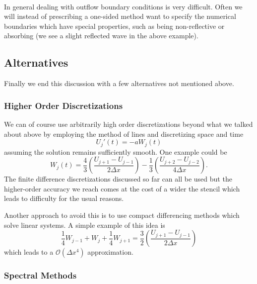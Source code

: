 \documentclass[11pt]{article}
\begin{document}
    \begin{center}
    \end{center}
    { \hspace*{\fill} \\}
    
    In general dealing with outflow boundary conditions is very difficult.
Often we will instead of prescribing a one-sided method want to specify
the numerical boundaries which have special properties, such as being
non-reflective or absorbing (we see a slight reflected wave in the above
example).

    \hypertarget{alternatives}{%
\subsection{Alternatives}\label{alternatives}}

Finally we end this discussion with a few alternatives not mentioned
above.

    \hypertarget{higher-order-discretizations}{%
\subsubsection{Higher Order
Discretizations}\label{higher-order-discretizations}}

We can of course use arbitrarily high order discretizations beyond what
we talked about above by employing the method of lines and discretizing
space and time \[
    U_j'(t) = -a W_j(t)
\] assuming the solution remains sufficiently smooth. One example could
be \[
    W_j(t) = \frac{4}{3} \left(\frac{U_{j+1} - U_{j-1}}{2 \Delta x} \right )- \frac{1}{3} \left(\frac{U_{j+2} - U_{j-2}}{4 \Delta x} \right ).
\] The finite difference discretizations discussed so far can all be
used but the higher-order accuracy we reach comes at the cost of a wider
the stencil which leads to difficulty for the usual reasons.

    Another approach to avoid this is to use compact differencing methods
which solve linear systems. A simple example of this idea is \[
    \frac{1}{4} W_{j-1} + W_j + \frac{1}{4} W_{j+1} = \frac{3}{2} \left( \frac{U_{j+1} - U_{j-1}}{2 \Delta x} \right )
\] which leads to a \(\mathcal{O}(\Delta x^4)\) approximation.

    \hypertarget{spectral-methods}{%
\subsubsection{Spectral Methods}\label{spectral-methods}}
\end{document}
